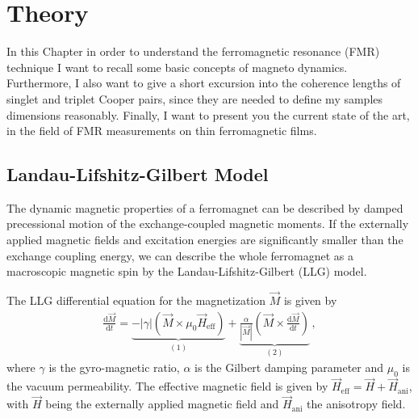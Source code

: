 \chapter{Theory}
In this Chapter in order to understand the ferromagnetic resonance (FMR) technique I want to recall some basic concepts of magneto dynamics. Furthermore, I also want to give a short excursion into the coherence lengths of singlet and triplet Cooper pairs, since they are needed to define my samples dimensions reasonably. Finally, I want to present you the current state of the art, in the field of FMR measurements on thin ferromagnetic films.

\section{Landau-Lifshitz-Gilbert Model}
The dynamic magnetic properties of a ferromagnet can be described by damped precessional motion of the exchange-coupled magnetic moments.
If the externally applied magnetic fields and excitation energies are significantly smaller than the exchange coupling energy, we can describe the whole ferromagnet as a macroscopic magnetic spin by the Landau-Lifshitz-Gilbert (LLG) model. \cite{LANDAU199251, Gilbert2004}

The LLG differential equation for the magnetization $\vec{M}$ is given by
\begin{align}
\frac{\text{d}\vec{M}}{\text{d}t}=\underbrace{-\left|\gamma\right| \left(\vec{M}\times \mu_0 \vec{H}_\text{eff}\right)}_{(1)}
+\underbrace{\frac{\alpha}{\left|\vec{M}\right|}\left( \vec{M}\times \frac{\text{d}\vec{M}}{\text{d}t}\right)}_{(2)}\,,\label{formula:LLG}
\end{align}
where $\gamma$ is the gyro-magnetic ratio, $\alpha$ is the Gilbert damping parameter and $\mu_0$ is the vacuum permeability. The effective magnetic field is given by $\vec{H}_\text{eff}=\vec{H}+\vec{H}_\text{ani}$, with $\vec{H}$ being the externally applied magnetic field and $\vec{H}_\text{ani}$ the anisotropy field. 

